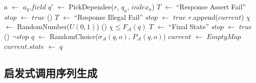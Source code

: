 \begin{algorithm}
{{{{{                                	$a$ $\gets$ $a_q.field$\;
                                    $q'$ $\gets$ PickDependee($r$, $q_a$, $index_a$)\;
                                     {
                                    	$T$ $\gets$ ``Response Assert Fail''\;
                                        $stop$ $\gets$ $true$\;
                                    }
                                } \Else() {
                                	 {
                                    	$T$ $\gets$ ``Response Illegal Fail''\;
                                        $stop$ $\gets$ $true$\;
                                    }
                                }
                            }
                        }
                    }
                    $r$.append($current$)\;
                     {
                    	$\chi$ $\gets$ RandomNumber($U(0,1)$)\;
                        \If() {$\chi \le F_{\mathcal{A}}(q)$} {
                        	$T$ $\gets$ ``Final State''\;
                            $stop$ $\gets$ $true$\;
                        }
                    }
                	\If() {$\neg stop$} {
                    	$q$ $\gets$ RandomChoice($\sigma_{\mathcal{A}}(q,o)$, $P_{\mathcal{A}}(q,o)$)\;
                        $current$ $\gets$ $EmptyMap$\;
                        $current.state$ $\gets$ $q$\;
                    }
                }
    
                \label{algo:seqgen}
              \end{algorithm}
        
        \subsection{启发式调用序列生成}
    

